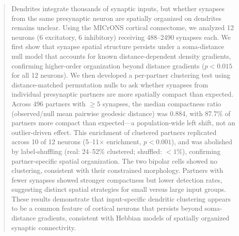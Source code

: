 \begin{abstract}
Dendrites integrate thousands of synaptic inputs, but whether synapses from the same presynaptic neuron are spatially organized on dendrites remains unclear. Using the MICrONS cortical connectome, we analyzed 12 neurons (6 excitatory, 6 inhibitory) receiving 488--2490 synapses each. We first show that synapse spatial structure persists under a soma-distance null model that accounts for known distance-dependent density gradients, confirming higher-order organization beyond distance gradients ($p < 0.015$ for all 12 neurons). We then developed a per-partner clustering test using distance-matched permutation nulls to ask whether synapses from individual presynaptic partners are more spatially compact than expected. Across 496 partners with $\geq 5$ synapses, the median compactness ratio (observed/null mean pairwise geodesic distance) was 0.884, with 87.7\% of partners more compact than expected---a population-wide left shift, not an outlier-driven effect. This enrichment of clustered partners replicated across 10 of 12 neurons (5--11$\times$ enrichment, $p < 0.001$), and was abolished by label-shuffling (real: 24--52\% clustered; shuffled: $< 1\%$), confirming partner-specific spatial organization. The two bipolar cells showed no clustering, consistent with their constrained morphology. Partners with fewer synapses showed stronger compactness but lower detection rates, suggesting distinct spatial strategies for small versus large input groups. These results demonstrate that input-specific dendritic clustering appears to be a common feature of cortical neurons that persists beyond soma-distance gradients, consistent with Hebbian models of spatially organized synaptic connectivity.
\end{abstract}
